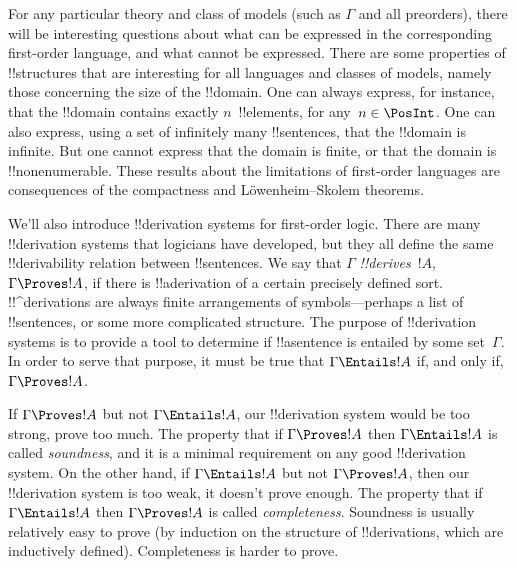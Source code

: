 For any particular theory and class of models (such as $\Gamma$ and
all preorders), there will be interesting questions about what can be
expressed in the corresponding first-order language, and what cannot
be expressed. There are some properties of !!{structure}s that are
interesting for all languages and classes of models, namely those
concerning the size of the !!{domain}.  One can always express, for
instance, that the !!{domain} contains exactly $n$~!!{element}s, for
any~$n \in \PosInt$.  One can also express, using a set of infinitely
many !!{sentence}s, that the !!{domain} is infinite.  But one cannot
express that the domain is finite, or that the domain is
!!{nonenumerable}. These results about the limitations of first-order
languages are consequences of the compactness and L\"owenheim--Skolem
theorems.







We'll also introduce !!{derivation} systems for first-order logic.  There are
many !!{derivation} systems that logicians have developed, but they all define
the same !!{derivability} relation between !!{sentence}s. We say that
$\Gamma$ \emph{!!{derive}s}~$!A$, $\Gamma \Proves !A$, if there is
!!a{derivation} of a certain precisely defined sort. !!^{derivation}s
are always finite arrangements of symbols---perhaps a list of
!!{sentence}s, or some more complicated structure.  The purpose of
!!{derivation} systems is to provide a tool to determine if !!a{sentence} is
entailed by some set~$\Gamma$.  In order to serve that purpose, it
must be true that $\Gamma \Entails !A$ if, and only if, $\Gamma
\Proves !A$.

If $\Gamma \Proves !A$ but not $\Gamma \Entails !A$, our !!{derivation} system
would be too strong, prove too much.  The property that if $\Gamma
\Proves !A$ then $\Gamma \Entails !A$ is called \emph{soundness}, and
it is a minimal requirement on any good !!{derivation} system. On the other
hand, if $\Gamma \Entails !A$ but not $\Gamma \Proves !A$, then our
!!{derivation} system is too weak, it doesn't prove enough.  The property that
if $\Gamma \Entails !A$ then $\Gamma \Proves !A$ is called
\emph{completeness}. Soundness is usually relatively easy to prove (by
induction on the structure of !!{derivation}s, which are inductively
defined). Completeness is harder to prove.

